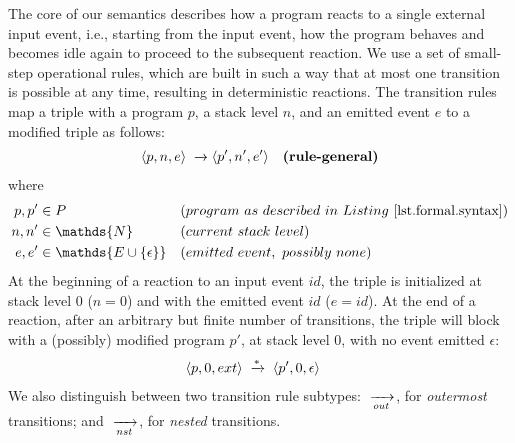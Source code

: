 The core of our semantics describes how a program reacts to a single external 
input event, i.e., starting from the input event, how the program behaves and 
becomes idle again to proceed to the subsequent reaction.
%
We use a set of small-step operational rules, which are built in such a way 
that at most one transition is possible at any time, resulting in deterministic 
reactions.
%
The transition rules map a triple with a program $p$, a stack level $n$, and an
emitted event $e$ to a modified triple as follows:
%
\begin{align*}
\langle p,  n,  e  \rangle &\;\xrightarrow{\;}
\langle p', n', e' \rangle
    & \textbf{(rule-general)}
\end{align*}
%
where
%
\begin{align*}
p, p' &\in P
    && (program~as~described~in~Listing~\ref{lst.formal.syntax})
\\
n, n' &\in \mathds{N}
    && (current~stack~level)
\\
e, e' &\in \mathds{E \cup \{\epsilon\}}
    && (emitted~event,~possibly~none)
\end{align*}
%
At the beginning of a reaction to an input event $id$, the triple is
initialized at stack level $0$ ($n=0$) and with the emitted event $id$
($e=id$).
At the end of a reaction, after an arbitrary but finite number of transitions,
the triple will block with a (possibly) modified program $p'$, at stack level
$0$, with no event emitted $\epsilon$:
%
\begin{align*}
\langle p,0,ext \rangle
    & \;\xrightarrow{*}\;
\langle p',0,\epsilon \rangle
\end{align*}
%
We also distinguish between two transition rule subtypes:
    $\;\xrightarrow[out]{\;}$, for \emph{outermost} transitions; and
    $\;\xrightarrow[nst]{\;}$, for \emph{nested} transitions.

